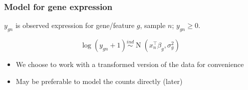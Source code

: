 \documentclass{beamer}
\newcommand{\op}{\operatorname}
\newcommand{\ind}{\stackrel{ind}{\sim}}
\begin{document}


\begin{frame}
\frametitle{Model for gene expression}
$y_{gn}$ is observed expression for gene/feature $g$, sample $n$; $y_{gn} \ge 0$.

\[\log(y_{gn}+1) \ind \op{N}\left(x_{n}^\top\beta_g, \sigma^2_g\right) \]

\begin{itemize}
\item We choose to work with a transformed version of the data for convenience

\item May be preferable to model the counts directly (later)
\end{itemize}
\end{frame}

% 
%   
% 
\end{document}
